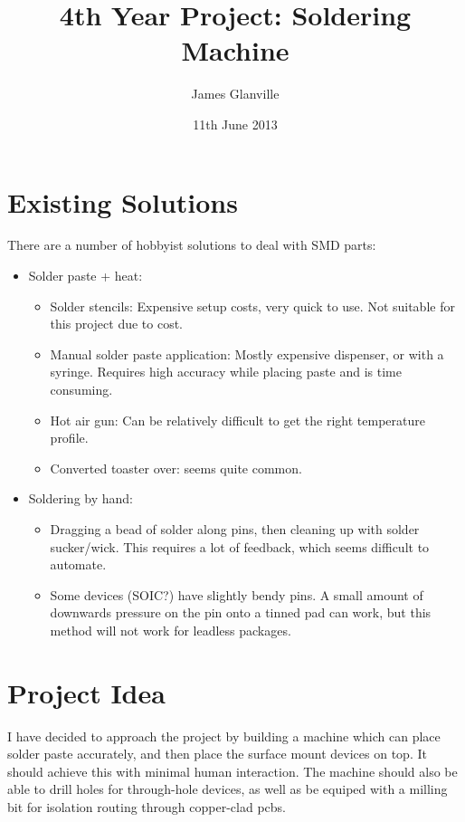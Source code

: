 \documentclass[a4paper,11pt]{article}  %
\title{4th Year Project: Soldering Machine}
\author{James Glanville}
\date{11th June 2013}
\begin{document}
\maketitle

\section{Existing Solutions}
There are a number of hobbyist solutions to deal with SMD parts:

\begin{itemize}
	\item	Solder paste + heat:
		\begin{itemize}
			\item	Solder stencils: Expensive setup costs, very quick to use. Not suitable for
				this project due to cost.
			\item	Manual solder paste application: Mostly expensive dispenser, or with a syringe.
					Requires high accuracy while placing paste and is time consuming.
			\item	Hot air gun: Can be relatively difficult to get the right temperature profile.
			\item	Converted toaster over: seems quite common.
		\end{itemize}

	\item	Soldering by hand:
		\begin{itemize}
			\item	Dragging a bead of solder along pins, then cleaning up with solder sucker/wick.
				This requires a lot of feedback, which seems difficult to automate.
			\item	Some devices (SOIC?) have slightly bendy pins. A small amount of downwards 
				pressure on the pin onto a tinned pad can work, but this method will not work for leadless packages.
		\end{itemize}
\end{itemize}

\section{Project Idea}
I have decided to approach the project by building a machine which can place solder paste accurately, and then place
the surface mount devices on top. It should achieve this with minimal human interaction. The machine should also be able to
drill holes for through-hole devices, as well as be equiped with a milling bit for isolation routing through copper-clad pcbs.
\end{document}
